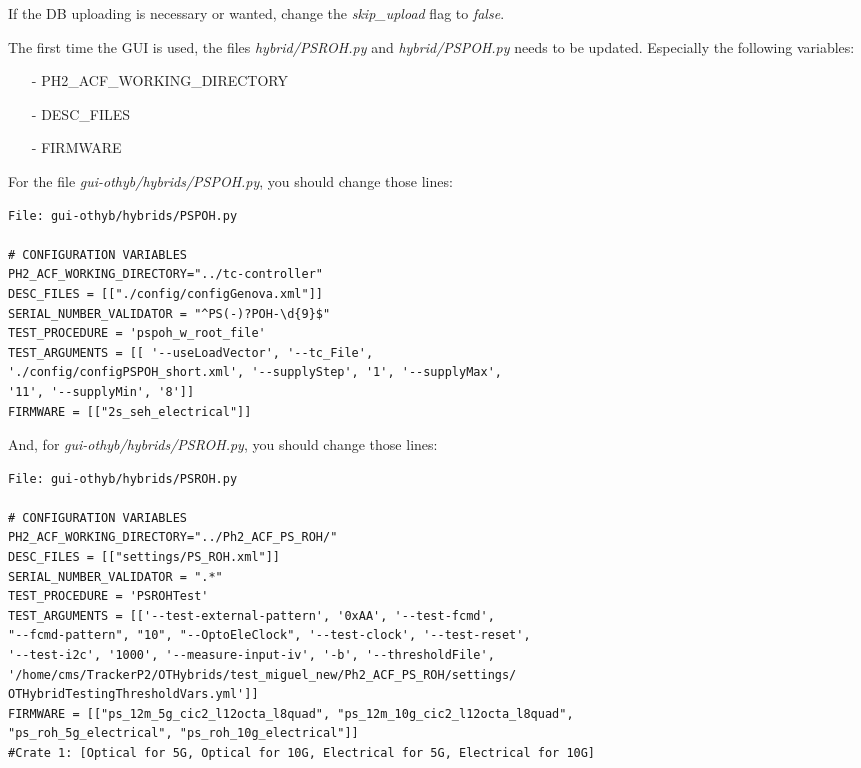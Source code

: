 \documentclass[10pt,a4paper]{article}
\begin{document}
If the DB uploading is necessary or wanted, change the \emph{skip\_upload} flag to \emph{false}.

The first time the GUI is used, the files \emph{hybrid/PSROH.py} and \emph{hybrid/PSPOH.py} needs to be updated. Especially the following variables:
\begin{itemize}
\item[-] PH2\_ACF\_WORKING\_DIRECTORY
\item[-] DESC\_FILES
\item[-] FIRMWARE
\end{itemize}

For the file \emph{gui-othyb/hybrids/PSPOH.py}, you should change those lines:

\begin{framed}
\begin{verbatim}
File: gui-othyb/hybrids/PSPOH.py

# CONFIGURATION VARIABLES
PH2_ACF_WORKING_DIRECTORY="../tc-controller"
DESC_FILES = [["./config/configGenova.xml"]]
SERIAL_NUMBER_VALIDATOR = "^PS(-)?POH-\d{9}$"
TEST_PROCEDURE = 'pspoh_w_root_file'
TEST_ARGUMENTS = [[ '--useLoadVector', '--tc_File', 
'./config/configPSPOH_short.xml', '--supplyStep', '1', '--supplyMax', 
'11', '--supplyMin', '8']]
FIRMWARE = [["2s_seh_electrical"]] 

\end{verbatim}
\end{framed}

And, for \emph{gui-othyb/hybrids/PSROH.py}, you should change those lines:

\begin{framed}
\begin{verbatim}
File: gui-othyb/hybrids/PSROH.py

# CONFIGURATION VARIABLES
PH2_ACF_WORKING_DIRECTORY="../Ph2_ACF_PS_ROH/"
DESC_FILES = [["settings/PS_ROH.xml"]]
SERIAL_NUMBER_VALIDATOR = ".*"
TEST_PROCEDURE = 'PSROHTest'
TEST_ARGUMENTS = [['--test-external-pattern', '0xAA', '--test-fcmd', 
"--fcmd-pattern", "10", "--OptoEleClock", '--test-clock', '--test-reset', 
'--test-i2c', '1000', '--measure-input-iv', '-b', '--thresholdFile', 
'/home/cms/TrackerP2/OTHybrids/test_miguel_new/Ph2_ACF_PS_ROH/settings/
OTHybridTestingThresholdVars.yml']]
FIRMWARE = [["ps_12m_5g_cic2_l12octa_l8quad", "ps_12m_10g_cic2_l12octa_l8quad", 
"ps_roh_5g_electrical", "ps_roh_10g_electrical"]]       
#Crate 1: [Optical for 5G, Optical for 10G, Electrical for 5G, Electrical for 10G]

\end{verbatim}
\end{framed}
\end{document}
